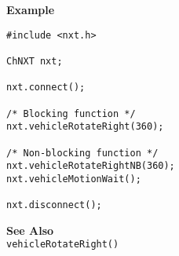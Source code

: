 \noindent
{\bf Example}
\begin{verbatim}
#include <nxt.h>

ChNXT nxt;

nxt.connect();

/* Blocking function */
nxt.vehicleRotateRight(360);

/* Non-blocking function */
nxt.vehicleRotateRightNB(360);
nxt.vehicleMotionWait();

nxt.disconnect();
\end{verbatim}

\noindent
{\bf See Also}\\
\texttt{vehicleRotateRight()}

